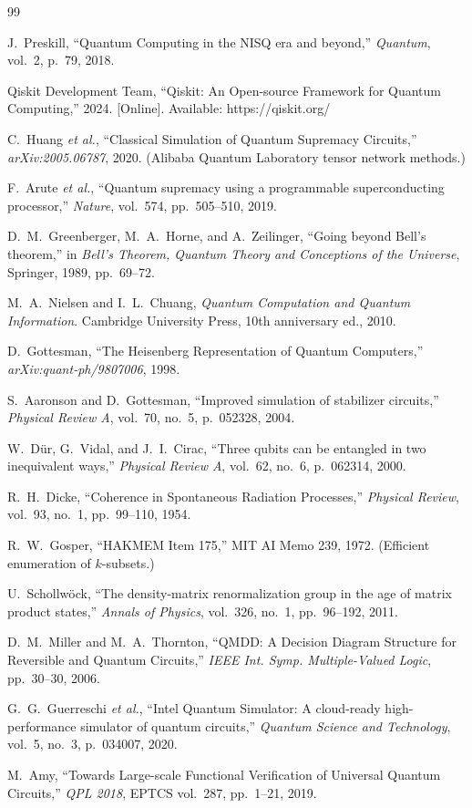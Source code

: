 \documentclass[11pt,twocolumn]{article}
\begin{document}
\begin{thebibliography}{99}

J.~Preskill, ``Quantum Computing in the NISQ era and beyond,'' \emph{Quantum}, vol.~2, p.~79, 2018.

Qiskit Development Team, ``Qiskit: An Open-source Framework for Quantum Computing,'' 2024. [Online]. Available: https://qiskit.org/

C.~Huang \emph{et al.}, ``Classical Simulation of Quantum Supremacy Circuits,'' \emph{arXiv:2005.06787}, 2020. (Alibaba Quantum Laboratory tensor network methods.)

F.~Arute \emph{et al.}, ``Quantum supremacy using a programmable superconducting processor,'' \emph{Nature}, vol.~574, pp.~505--510, 2019.

D.~M.~Greenberger, M.~A.~Horne, and A.~Zeilinger, ``Going beyond Bell's theorem,'' in \emph{Bell's Theorem, Quantum Theory and Conceptions of the Universe}, Springer, 1989, pp.~69--72.

M.~A.~Nielsen and I.~L.~Chuang, \emph{Quantum Computation and Quantum Information}. Cambridge University Press, 10th anniversary ed., 2010.

D.~Gottesman, ``The Heisenberg Representation of Quantum Computers,'' \emph{arXiv:quant-ph/9807006}, 1998.

S.~Aaronson and D.~Gottesman, ``Improved simulation of stabilizer circuits,'' \emph{Physical Review A}, vol.~70, no.~5, p.~052328, 2004.

W.~D\"ur, G.~Vidal, and J.~I.~Cirac, ``Three qubits can be entangled in two inequivalent ways,'' \emph{Physical Review A}, vol.~62, no.~6, p.~062314, 2000.

R.~H.~Dicke, ``Coherence in Spontaneous Radiation Processes,'' \emph{Physical Review}, vol.~93, no.~1, pp.~99--110, 1954.

R.~W.~Gosper, ``HAKMEM Item 175,'' MIT AI Memo 239, 1972. (Efficient enumeration of $k$-subsets.)

U.~Schollw\"ock, ``The density-matrix renormalization group in the age of matrix product states,'' \emph{Annals of Physics}, vol.~326, no.~1, pp.~96--192, 2011.

D.~M.~Miller and M.~A.~Thornton, ``QMDD: A Decision Diagram Structure for Reversible and Quantum Circuits,'' \emph{IEEE Int. Symp. Multiple-Valued Logic}, pp.~30--30, 2006.

G.~G.~Guerreschi \emph{et al.}, ``Intel Quantum Simulator: A cloud-ready high-performance simulator of quantum circuits,'' \emph{Quantum Science and Technology}, vol.~5, no.~3, p.~034007, 2020.

M.~Amy, ``Towards Large-scale Functional Verification of Universal Quantum Circuits,'' \emph{QPL 2018}, EPTCS vol.~287, pp.~1--21, 2019.

\end{thebibliography}
\end{document}
